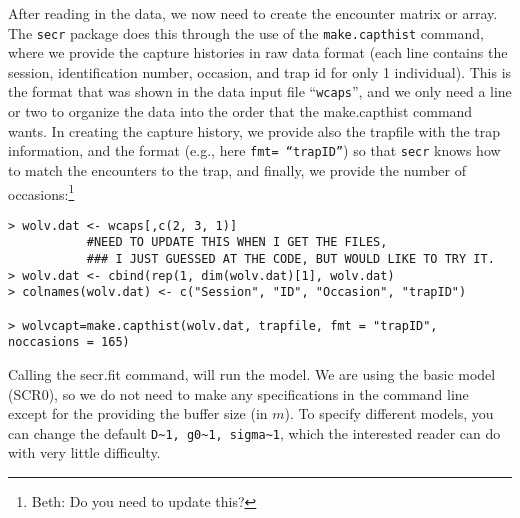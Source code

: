 After reading in the data, we now need to create the encounter matrix
or array.  The \mbox{\tt secr} package does this through the use of the
\mbox{\tt make.capthist} command, where we provide the capture histories in raw
data format (each line contains the session, identification number,
occasion, and trap id for only 1 individual).  This is the format that
was shown in the data input file ``\mbox{\tt wcaps}'', and we only need a line or
two to organize the data into the order that the make.capthist command
wants.  In creating the capture history, we provide also the trapfile
with the trap information, and the format (e.g., here \mbox{\tt fmt= ``trapID''})
so that \mbox{\tt secr} knows how to match the encounters to the trap, and
finally, we provide the number of occasions:\footnote{Beth: Do you
  need to update this?}
{\small 
\begin{verbatim}
> wolv.dat <- wcaps[,c(2, 3, 1)]   
           #NEED TO UPDATE THIS WHEN I GET THE FILES, 
           ### I JUST GUESSED AT THE CODE, BUT WOULD LIKE TO TRY IT. 
> wolv.dat <- cbind(rep(1, dim(wolv.dat)[1], wolv.dat)  
> colnames(wolv.dat) <- c("Session", "ID", "Occasion", "trapID")

> wolvcapt=make.capthist(wolv.dat, trapfile, fmt = "trapID", noccasions = 165)
\end{verbatim}
}
Calling the secr.fit command, will run the model.  We are using the
basic model (SCR0), so we do not need to make any specifications in
the command line except for the providing the buffer size (in $m$).  To
specify different models, you can change the default
\verb#D~1, g0~1, sigma~1#, which the interested reader can do with
very little difficulty.

